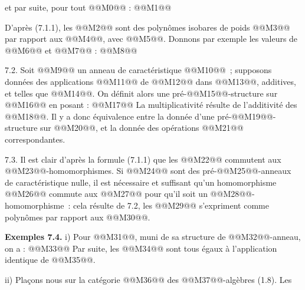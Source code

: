 
et par
suite, pour tout @@M0@@ :
@@M1@@

D'après (7.1.1), les @@M2@@ sont des polynômes isobares de poids @@M3@@ par rapport aux @@M4@@, avec @@M5@@. Donnons par exemple les valeurs de @@M6@@ et @@M7@@ :
@@M8@@

7.2. Soit @@M9@@ un anneau de caractéristique @@M10@@~; supposons données des applications @@M11@@ de @@M12@@ dans @@M13@@, additives, et telles que @@M14@@. On définit alors une pré-@@M15@@-structure sur @@M16@@ en posant :
@@M17@@
La multiplicativité résulte de l'additivité des @@M18@@. Il y a donc équivalence entre la donnée d'une pré-@@M19@@-structure sur @@M20@@, et la donnée des opérations @@M21@@ correspondantes.

7.3. Il est clair d'après la formule (7.1.1) que les @@M22@@ commutent aux @@M23@@-homomorphismes. Si @@M24@@ sont des pré-@@M25@@-anneaux de caractéristique nulle, il est nécessaire et suffisant qu'un homomorphisme @@M26@@ commute aux @@M27@@ pour qu'il soit un @@M28@@-homomorphisme~: cela résulte de 7.2, les @@M29@@ s'expriment comme polynômes par rapport aux @@M30@@.

\textbf{Exemples 7.4.} i) Pour @@M31@@, muni de sa structure de @@M32@@-anneau, on a :
@@M33@@
Par suite, les @@M34@@ sont tous égaux à l'application identique de @@M35@@.

ii) Plaçons nous sur la catégorie @@M36@@ des @@M37@@-algèbres (1.8). Les 
